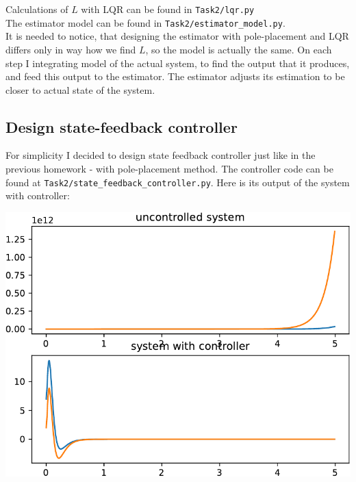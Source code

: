 \documentclass[a4paper,12pt]{article}
\begin{document}
Calculations of $L$ with LQR can be found in \texttt{Task2/lqr.py}\\
The estimator model can be found in \texttt{Task2/estimator\_model.py}.\\
It is needed to notice, that designing the estimator with pole-placement and LQR
differs only in way how we find $L$, so the model is actually the same. On each 
step I integrating model of the actual system, to find the output that it produces, 
and feed this output to the estimator. The estimator adjusts its estimation to
be closer to actual state of the system.
\subsection{Design state-feedback controller}
For simplicity I decided to design state feedback controller just like in the 
previous homework - with pole-placement method. The controller code can be found 
at \texttt{Task2/state\_feedback\_controller.py}.
Here is its output of the system with controller:
\begin{center}
    \includegraphics[width=\linewidth]{../Task2/out.pdf}
\end{center}
\end{document}
